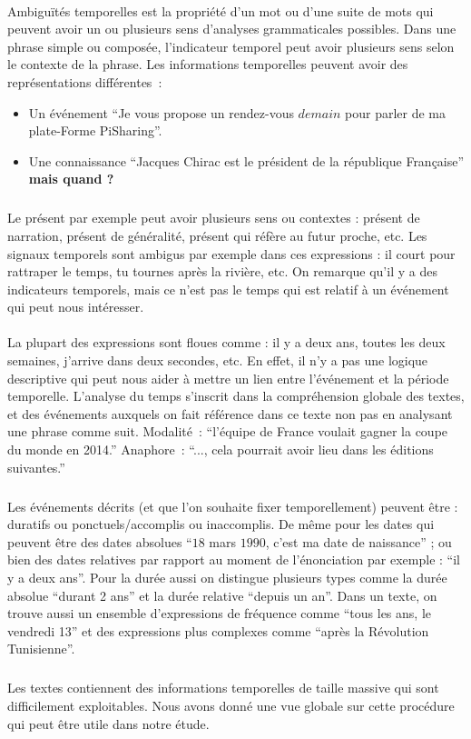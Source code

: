 \paragraph{}
 Ambiguïtés temporelles est la propriété d'un mot ou d'une suite de mots qui peuvent avoir un ou plusieurs sens d'analyses grammaticales possibles. Dans une phrase simple ou composée, l'indicateur temporel peut avoir plusieurs sens selon le contexte de la phrase. Les informations temporelles peuvent avoir des représentations différentes~: 
\begin{itemize}
\item Un événement ``Je vous propose un rendez-vous $demain$ pour parler de ma plate-Forme PiSharing''. \item Une connaissance ``Jacques Chirac est le président de la république Française'' \textbf{ mais quand ?}
\end{itemize}
\subparagraph{} 
Le présent par exemple peut avoir plusieurs sens ou contextes : présent de narration, présent de généralité, présent qui réfère au futur proche, etc.
Les signaux temporels sont ambigus par exemple dans ces expressions : il court pour rattraper le temps, tu tournes après la rivière, etc. On remarque qu'il y a des indicateurs temporels, mais ce n'est pas le temps qui est relatif à un événement qui peut nous intéresser.
\paragraph{}
La plupart des expressions sont floues comme : il y a deux ans, toutes les deux semaines, j’arrive dans deux secondes, etc. En effet, il n'y a pas une logique descriptive qui peut nous aider à mettre un lien entre l'événement et la période temporelle. L’analyse du temps s’inscrit dans la compréhension globale des textes, et des événements auxquels on fait référence dans ce texte non pas en analysant une phrase comme suit. 
\newline
Modalité~: ``l’équipe de France voulait gagner la coupe du monde en 2014.'' 
\newline
Anaphore~:  ``..., cela pourrait avoir lieu dans les éditions suivantes.''
\subparagraph{}
Les événements décrits (et que l’on souhaite fixer temporellement) peuvent être : duratifs ou ponctuels/accomplis ou inaccomplis. 
De même pour les dates qui peuvent être des dates absolues ``$18$ mars $1990$, c'est ma date de naissance'' ; ou bien des dates relatives par rapport au moment de l’énonciation par exemple : ``il y a deux ans''. Pour la durée aussi on distingue plusieurs types comme la durée absolue ``durant 2 ans'' et la durée relative ``depuis un an''. Dans un texte, on trouve aussi un ensemble d'expressions de fréquence comme ``tous les ans, le vendredi 13'' et des expressions plus complexes comme ``après la Révolution Tunisienne''.
\subparagraph{}
Les textes contiennent des informations temporelles de taille massive qui sont difficilement exploitables. Nous avons donné une vue globale sur cette procédure qui peut être utile dans notre étude.
